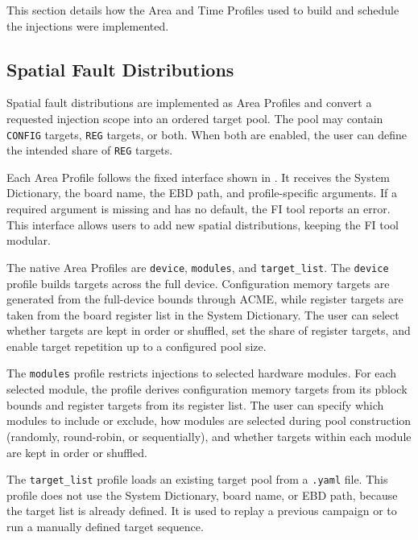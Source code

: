This section details how the Area and Time Profiles used to build and schedule the injections were implemented.

\subsection{Spatial Fault Distributions}
\label{chap8:fi_area}

Spatial fault distributions are implemented as Area Profiles and convert a requested injection scope into an ordered target pool. The pool may contain \texttt{CONFIG} targets, \texttt{REG} targets, or both. When both are enabled, the user can define the intended share of \texttt{REG} targets.


Each Area Profile follows the fixed interface shown in . It receives the System Dictionary, the board name, the \ac{EBD} path, and profile-specific arguments. If a required argument is missing and has no default, the \ac{FI} tool reports an error. This interface allows users to add new spatial distributions, keeping the \ac{FI} tool modular.

The native Area Profiles are \texttt{device}, \texttt{modules}, and \texttt{target\_list}. The \texttt{device} profile builds targets across the full device. Configuration memory targets are generated from the full-device bounds through \ac{ACME}, while register targets are taken from the board register list in the System Dictionary. The user can select whether targets are kept in order or shuffled, set the share of register targets, and enable target repetition up to a configured pool size.

The \texttt{modules} profile restricts injections to selected hardware modules. For each selected module, the profile derives configuration memory targets from its pblock bounds and register targets from its register list. The user can specify which modules to include or exclude, how modules are selected during pool construction (randomly, round-robin, or sequentially), and whether targets within each module are kept in order or shuffled.

The \texttt{target\_list} profile loads an existing target pool from a \texttt{.yaml} file. This profile does not use the System Dictionary, board name, or \ac{EBD} path, because the target list is already defined. It is used to replay a previous campaign or to run a manually defined target sequence.





